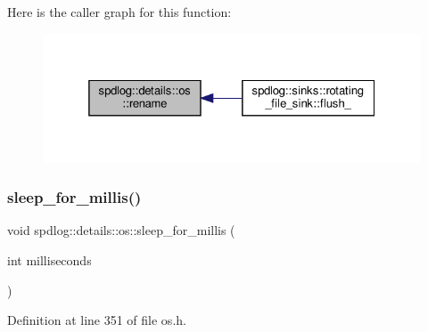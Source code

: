 Here is the caller graph for this function\+:
\nopagebreak
\begin{figure}[H]
\begin{center}
\leavevmode
\includegraphics[width=325pt]{namespacespdlog_1_1details_1_1os_a88940402c9b1b8c9d01ea7dae8f26127_icgraph}
\end{center}
\end{figure}
\mbox{\label{namespacespdlog_1_1details_1_1os_a49ccbc872aa679db9d1187a48897804e}} 
\subsubsection{\texorpdfstring{sleep\+\_\+for\+\_\+millis()}{sleep\_for\_millis()}}
{\footnotesize\ttfamily void spdlog\+::details\+::os\+::sleep\+\_\+for\+\_\+millis (\begin{DoxyParamCaption}\item[{int}]{milliseconds }\end{DoxyParamCaption})\hspace{0.3cm}{\ttfamily [inline]}}



Definition at line 351 of file os.\+h.

